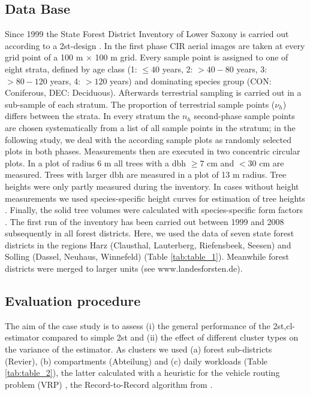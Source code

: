 \subsection{Data Base} 
Since 1999 the State Forest District Inventory of Lower Saxony is carried out according to a 2st-design \citep{Boeckmann_1998}. In the first phase CIR aerial images are taken at every grid point of a 100 m $\times$ 100 m grid. Every sample point is assigned to one of eight strata, defined by age class (1: $\leq40$ years, 2: $> 40 - 80$ years, 3: $> 80 - 120$ years, 4: $ > 120$ years) and dominating species group (CON: Coniferous, DEC: Deciduous). Afterwards terrestrial sampling is carried out in a sub-sample of each stratum. The proportion of terrestrial sample points ($\nu_h$) differs between the strata. In every stratum the $n_h$ second-phase sample points are chosen systematically from a list of all sample points in the stratum; in the following study, we deal with the according sample plots as randomly selected plots in both phases. Measurements then are executed in two concentric circular plots. In a plot of radius 6 m all trees with a dbh $\geq 7$ cm and $< 30$ cm are measured. Trees with larger dbh 
are measured in 
a plot 
of 13 m radius. Tree heights were only partly measured during the inventory. In cases without height measurements we used species-specific height curves for estimation of tree heights \citep{Sloboda_1993}. Finally, the solid tree volumes were calculated with species-specific form factors \citep{Bergel_1973,Bergel_1974}.
The first run of the inventory has been carried out between 1999 and 2008 subsequently in all forest districts. Here, we used the data of seven state forest districts in the regions Harz (Clausthal, Lauterberg, Riefensbeek, Seesen) and Solling (Dassel, Neuhaus, Winnefeld) (Table \ref{tab:table_1}). Meanwhile forest districts were merged to larger units (see www.landesforsten.de). 
\subsection{Evaluation procedure}
The aim of the case study is to assess (i) the general performance of the 2st,cl-estimator compared to simple 2st and (ii) the effect of different cluster types on the variance of the estimator. As clusters we used (a) forest sub-districts (Revier), (b) compartments (Abteilung) and (c) daily workloads (Table \ref{tab:table_2}), the latter calculated with a heuristic for the vehicle routing problem (VRP) \citep{Dantzig_1959}, the Record-to-Record algorithm from \citet{Li_2005}. 

